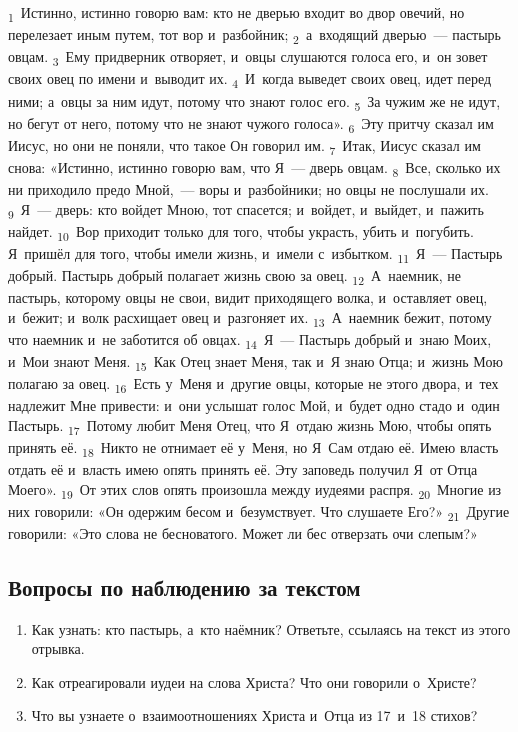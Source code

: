 \documentclass[a4paper,12pt]{article}
\begin{document}
\textsubscript{1}~Истинно, истинно говорю вам: кто не дверью входит во двор овечий, но перелезает иным путем, тот вор и~разбойник; \textsubscript{2}~а~входящий дверью~--- пастырь овцам. \textsubscript{3}~Ему придверник отворяет, и~овцы слушаются голоса его, и~он зовет своих овец по имени и~выводит их. \textsubscript{4}~И~когда выведет своих овец, идет перед ними; а~овцы за ним идут, потому что знают голос его. \textsubscript{5}~За чужим же не идут, но бегут от него, потому что не знают чужого голоса». \textsubscript{6}~Эту притчу сказал им Иисус, но они не поняли, что такое Он говорил им. \textsubscript{7}~Итак, Иисус сказал им снова: «Истинно, истинно говорю вам, что Я~— дверь овцам. \textsubscript{8}~Все, сколько их ни приходило предо Мной,~--- воры и~разбойники; но овцы не послушали их. \textsubscript{9}~Я~— дверь: кто войдет Мною, тот спасется; и~войдет, и~выйдет, и~пажить найдет. \textsubscript{10}~Вор приходит только для того, чтобы украсть, убить и~погубить. Я~пришёл для того, чтобы имели жизнь, и~имели с~избытком. \textsubscript{11}~Я~— Пастырь добрый. Пастырь добрый полагает жизнь свою за овец. \textsubscript{12}~А~наемник, не пастырь, которому овцы не свои, видит приходящего волка, и~оставляет овец, и~бежит; и~волк расхищает овец и~разгоняет их. \textsubscript{13}~А~наемник бежит, потому что наемник и~не заботится об овцах. \textsubscript{14}~Я~— Пастырь добрый и~знаю Моих, и~Мои знают Меня. \textsubscript{15}~Как Отец знает Меня, так и~Я знаю Отца; и~жизнь Мою полагаю за овец. \textsubscript{16}~Есть у~Меня и~другие овцы, которые не этого двора, и~тех надлежит Мне привести: и~они услышат голос Мой, и~будет одно стадо и~один Пастырь. \textsubscript{17}~Потому любит Меня Отец, что Я~отдаю жизнь Мою, чтобы опять принять её. \textsubscript{18}~Никто не отнимает её у~Меня, но Я~Сам отдаю её. Имею власть отдать её и~власть имею опять принять её. Эту заповедь получил Я~от Отца Моего». \textsubscript{19}~От этих слов опять произошла между иудеями распря. \textsubscript{20}~Многие из них говорили: «Он одержим бесом и~безумствует. Что слушаете Его?» \textsubscript{21}~Другие говорили: «Это слова не бесноватого. Может ли бес отверзать очи слепым?» 

\subsection*{Вопросы по наблюдению за текстом}
\begin{enumerate}
    \item Как узнать: кто пастырь, а~кто наёмник? Ответьте, ссылаясь на текст из этого отрывка. 
    
    \myline
    
    \myline
    \item Как отреагировали иудеи на слова Христа? Что они говорили о~Христе? 
    
    \myline
    
    \myline
    \item Что вы узнаете о~взаимоотношениях Христа и~Отца из 17~и~18 стихов? 
    
    \myline
    
    \myline
\end{enumerate}
\end{document}
